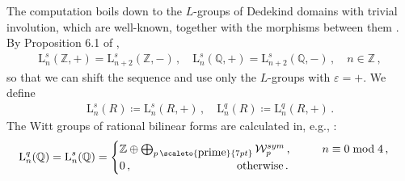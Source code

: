 \documentclass[sn-mathphys-num]{sn-jnl}
\theoremstyle{definition}
\numberwithin{equation}{section}
\theoremstyle{definition}
\def\CW {{\mathcal W}}
\def\L{{\mbox{L}}}
\def\ep{\varepsilon}
\def\IQ{\mathbb{Q}}
\def\IZ{{\mathbb{Z}}}
\begin{document}
The computation boils down to the $L$-groups of Dedekind domains with trivial involution, which are well-known, together with the morphisms between them \cite{wall1999surgery,RanickiAlgThofSurgery1,Ranicki1981ExactSI}. By Proposition 6.1 of \cite{RanickiAlgThofSurgery1}, 
\begin{align}
\L_n^s(\IZ,+)=\L^s_{n+2}(\IZ,-)\,,\quad \L_n^s(\IQ,+)=\L^s_{n+2}(\IQ,-)\,,\quad n\in \IZ\,,
\end{align}
so that we can shift the sequence and use only the $L$-groups with $\ep=+$. We define
\begin{align}
\L_n^s(R)\coloneqq  \L^s_n(R,+)\,,\quad \L_n^q(R)\coloneqq  \L^q_n(R,+)\,.
\end{align}
The Witt groups of rational bilinear forms are calculated in, e.g., \cite{milnor2013symmetric}:
\begin{align}
\L^q_n(\IQ)=\L_n^s(\IQ)=\begin{cases}
\IZ \oplus \bigoplus_{p\,\scaleto{\mbox{prime}}{7pt}}\CW^{sym}_p \,,\hspace{27pt}n\equiv 0\;\mbox{mod}\;4\,,\\
0\,,\quad\quad\quad\quad\quad\quad\quad\quad\quad \;\mbox{otherwise}\,.
\end{cases}
\end{align}
\end{document}

